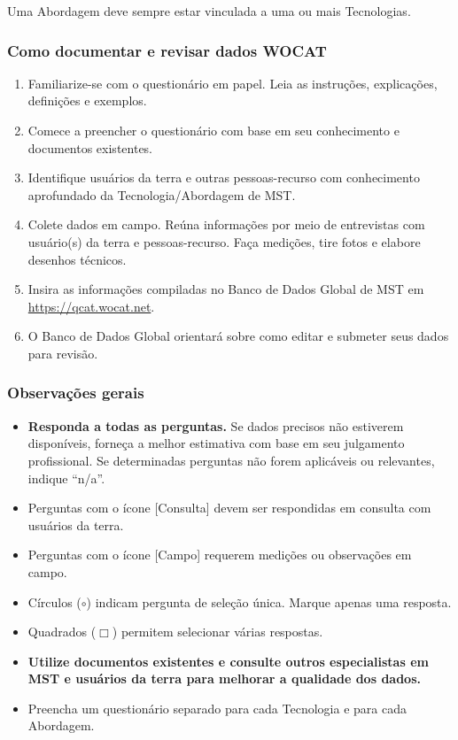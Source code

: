 Uma Abordagem deve sempre estar vinculada a uma ou mais Tecnologias.

\subsubsection{Como documentar e revisar dados WOCAT}\label{como-documentar-e-revisar-dados-wocat}

\begin{enumerate}
\def\labelenumi{\arabic{enumi}.}
\tightlist
\item
  Familiarize-se com o questionário em papel. Leia as instruções, explicações, definições e exemplos.
\item
  Comece a preencher o questionário com base em seu conhecimento e documentos existentes.
\item
  Identifique usuários da terra e outras pessoas-recurso com conhecimento aprofundado da Tecnologia/Abordagem de MST.
\item
  Colete dados em campo. Reúna informações por meio de entrevistas com usuário(s) da terra e pessoas-recurso. Faça medições, tire fotos e elabore desenhos técnicos.
\item
  Insira as informações compiladas no Banco de Dados Global de MST em \url{https://qcat.wocat.net}.
\item
  O Banco de Dados Global orientará sobre como editar e submeter seus dados para revisão.
\end{enumerate}

\subsubsection{Observações gerais}\label{observauxe7uxf5es-gerais}

\begin{itemize}
\tightlist
\item
  \textbf{Responda a todas as perguntas.} Se dados precisos não estiverem disponíveis, forneça a melhor estimativa com base em seu julgamento profissional. Se determinadas perguntas não forem aplicáveis ou relevantes, indique ``n/a''.
\item
  Perguntas com o ícone {[Consulta]} devem ser respondidas em consulta com usuários da terra.
\item
  Perguntas com o ícone {[Campo]} requerem medições ou observações em campo.
\item
  Círculos ($\circ$) indicam pergunta de seleção única. Marque apenas uma resposta.
\item
  Quadrados ($\Box$) permitem selecionar várias respostas.
\item
  \textbf{Utilize documentos existentes e consulte outros especialistas em MST e usuários da terra para melhorar a qualidade dos dados.}
\item
  Preencha um questionário separado para cada Tecnologia e para cada Abordagem.
\end{itemize}

